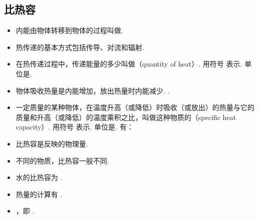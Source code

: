 \subsection{比热容}
\begin{itemize}
\item 内能由物体转移到物体的过程叫做.
\item 热传递的基本方式包括传导、对流和辐射.
\item 在热传递过程中，传递能量的多少叫做（quantity of heat）. 用符号  表示. 单位是. 
\item 物体吸收热量是内能增加，放出热量时内能减少. .
\item 一定质量的某种物体，在温度升高（或降低）时吸收（或放出）的热量与它的质量和升高（或降低）的温度乘积之比，叫做这种物质的（specific heat capacity）. 用符号  表示. 单位是. 有：
\item 比热容是反映的物理量.
\item 不同的物质，比热容一般不同.
\item 水的比热容为 .
\item 热量的计算有 .
\item {}，即 .
\end{itemize}
